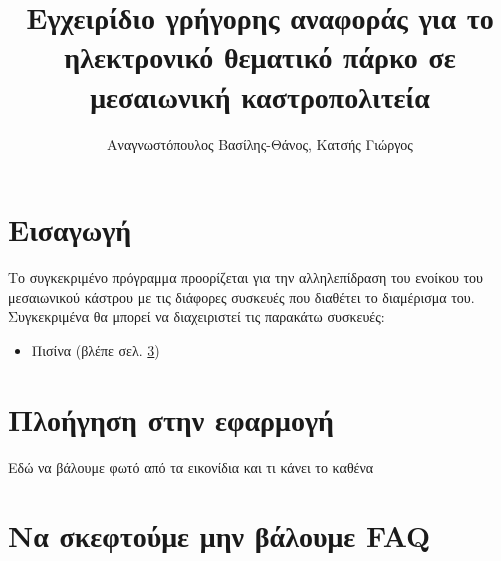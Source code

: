 \documentclass[a4paper,titlepage,twoside,12pt,leqno]{article}
\title{Εγχειρίδιο γρήγορης αναφοράς για το ηλεκτρονικό θεματικό πάρκο σε μεσαιωνική καστροπολιτεία}
\author{Αναγνωστόπουλος Βασίλης-Θάνος, Κατσής Γιώργος}
\date{}
\begin{document}
\maketitle


\section{Εισαγωγή}

Το συγκεκριμένο πρόγραμμα προορίζεται για την αλληλεπίδραση του ενοίκου του μεσαιωνικού κάστρου με τις διάφορες συσκευές που διαθέτει το διαμέρισμα του. Συγκεκριμένα θα μπορεί να διαχειριστεί τις παρακάτω συσκευές:

\begin{itemize}
\item Πισίνα (βλέπε σελ. \ref{})


\end{itemize}

\section{Πλοήγηση στην εφαρμογή}

Εδώ να βάλουμε φωτό από τα εικονίδια και τι κάνει το καθένα

\section{Να σκεφτούμε μην βάλουμε FAQ}
\end{document}

